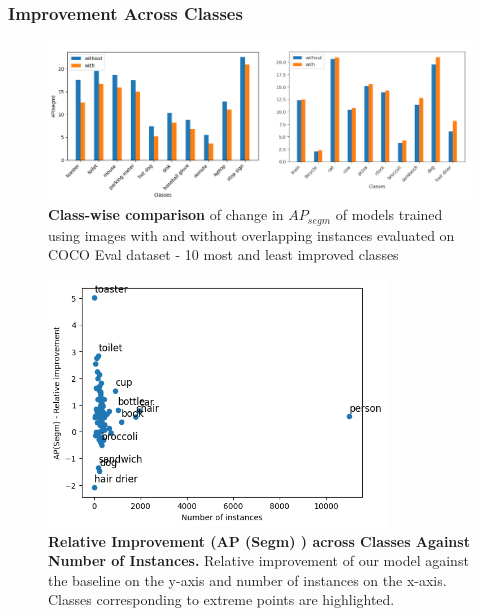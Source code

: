 \subsubsection{Improvement Across Classes}
\begin{figure}
	\centering
	\includegraphics[width=1.05\textwidth]{Images/main/overlap_classes_new.png}
	\caption[\textbf{Training without Overlapping Instances - Class-wise Comparison}]{\textbf{Class-wise comparison} of change in \(AP_{segm}\) of models trained using images with and without overlapping instances evaluated on COCO Eval dataset - 10 most and least improved classes}
	\label{fig:overlap_classes}
\end{figure}

\begin{figure}
	\centering
	\includegraphics[width=0.8\textwidth]{Images/main/relative_improvement.png}
	\caption[\textbf{Relative Improvement against Number of Instances}]{\textbf{Relative Improvement (AP (Segm) ) across Classes Against Number of Instances.} Relative improvement of our model against the baseline on the y-axis and number of instances on the x-axis. Classes corresponding to extreme points are highlighted.}
	\label{fig:relative_improvement}
\end{figure}

